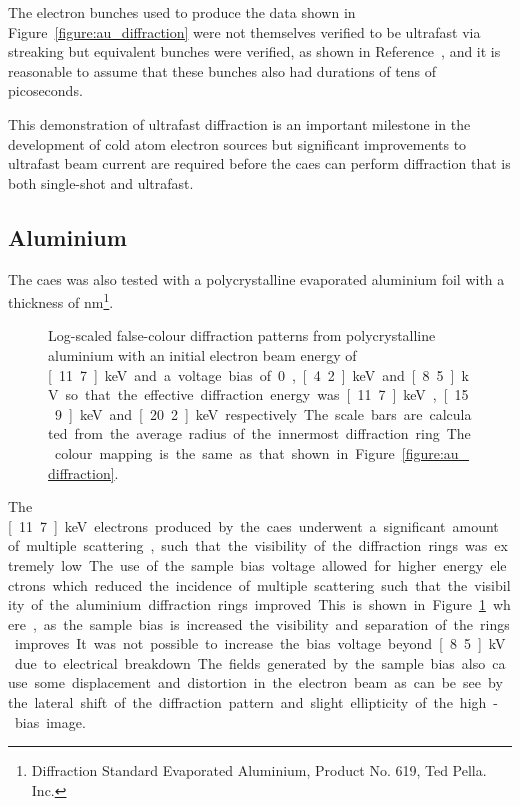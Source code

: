 The electron bunches used to produce the data shown in Figure~\ref{figure:au_diffraction} were not themselves verified to be ultrafast via streaking but equivalent bunches were verified, as shown in Reference~\cite{speirs_identification_2017}, and it is reasonable to assume that these bunches also had durations of tens of picoseconds.

This demonstration of ultrafast diffraction is an important milestone in the development of cold atom electron sources but significant improvements to ultrafast beam current are required before the \gls{caes} can perform diffraction that is both single-shot and ultrafast.

\subsection{Aluminium}\label{section:aluminium_diffraction}

The \gls{caes} was also tested with a polycrystalline evaporated aluminium foil with a thickness of \unit[31]{nm}\footnote{Diffraction Standard Evaporated Aluminium, Product No. 619, Ted Pella. Inc.}.

\begin{figure}
    \center
    
    \caption[Diffraction patterns from aluminium.]{Log-scaled false-colour diffraction patterns from polycrystalline aluminium with an initial electron beam energy of \unit[11.7]{keV} and a voltage bias of 0, \unit[4.2]{keV} and \unit[8.5]{kV} so that the effective diffraction energy was \unit[11.7]{keV}, \unit[15.9]{keV} and \unit[20.2]{keV} respectively. The scale bars are calculated from the average radius of the innermost diffraction ring. The colour mapping is the same as that shown in Figure~\ref{figure:au_diffraction}.}
    \label{figure:al_diffraction}
\end{figure}

The \unit[11.7]{keV} electrons produced by the \gls{caes} underwent a significant amount of multiple scattering, such that the visibility of the diffraction rings was extremely low.
The use of the sample bias voltage allowed for higher energy electrons which reduced the incidence of multiple scattering such that the visibility of the aluminium diffraction rings improved.
This is shown in Figure~\ref{figure:al_diffraction} where, as the sample bias is increased the visibility and separation of the rings improves.
It was not possible to increase the bias voltage beyond \unit[8.5]{kV} due to electrical breakdown.
The fields generated by the sample bias also cause some displacement and distortion in the electron beam as can be see by the lateral shift of the diffraction pattern and slight ellipticity of the high-bias image.


